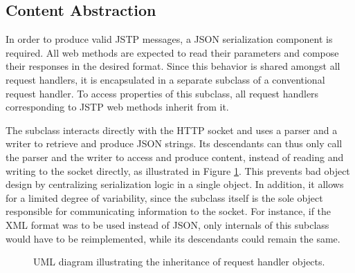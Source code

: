 \subsection{Content Abstraction}
In order to produce valid JSTP messages, a JSON serialization component is required. All web methods are expected to read their parameters and compose their responses in the desired format. Since this behavior is shared amongst all request handlers, it is encapsulated in a separate subclass of a conventional request handler. To access properties of this subclass, all request handlers corresponding to JSTP web methods inherit from it.

The subclass interacts directly with the HTTP socket and uses a parser and a writer to retrieve and produce JSON strings. Its descendants can thus only call the parser and the writer to access and produce content, instead of reading and writing to the socket directly, as illustrated in Figure \ref{fig:request-handlers}. This prevents bad object design by centralizing serialization logic in a single object. In addition, it allows for a limited degree of variability, since the subclass itself is the sole object responsible for communicating information to the socket. For instance, if the XML format was to be used instead of JSON, only internals of this subclass would have to be reimplemented, while its descendants could remain the same.

\begin{figure}[t]
\begin{center}

\caption{UML diagram illustrating the inheritance of request handler objects.}
\label{fig:request-handlers}
\end{center}
\end{figure}

